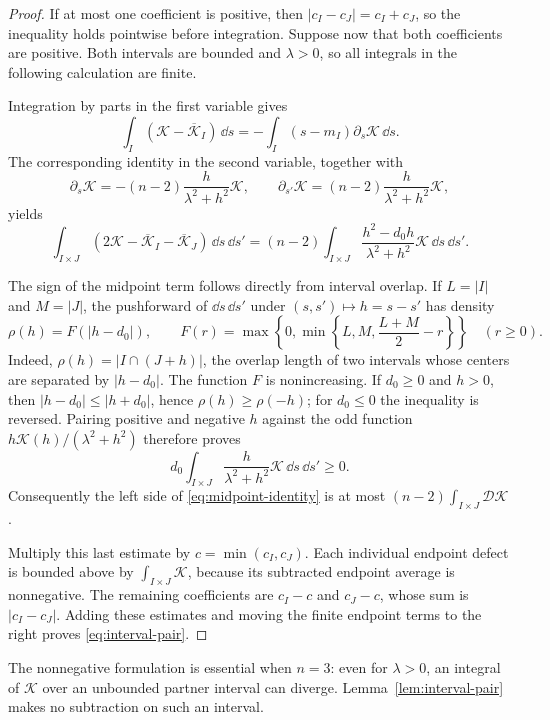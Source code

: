 \begin{proof}
If at most one coefficient is positive, then
$|c_I-c_J|=c_I+c_J$, so the inequality holds pointwise before integration.
Suppose now that both coefficients are positive.  Both intervals are
bounded and $\lambda>0$, so all integrals in the following calculation
are finite.

Integration by parts in the first variable gives
\[
 \int_I(\mathcal K-\overline{\mathcal K}_I)\,\dd s
 =-\int_I(s-m_I)\partial_s\mathcal K\,\dd s.
\]
The corresponding identity in the second variable, together with
\[
 \partial_s\mathcal K=-(n-2)\frac{h}{\lambda^2+h^2}\mathcal K,
 \qquad
 \partial_{s'}\mathcal K=(n-2)\frac{h}{\lambda^2+h^2}\mathcal K,
\]
yields
\begin{equation}\label{eq:midpoint-identity}
 \int_{I\times J}
  (2\mathcal K-\overline{\mathcal K}_I-\overline{\mathcal K}_J)
   \,\dd s\,\dd s'
 =(n-2)\int_{I\times J}
    \frac{h^2-d_0h}{\lambda^2+h^2}\mathcal K\,\dd s\,\dd s'.
\end{equation}

The sign of the midpoint term follows directly from interval overlap.
If $L=|I|$ and $M=|J|$, the pushforward of $\dd s\,\dd s'$ under
$(s,s')\mapsto h=s-s'$ has density
\[
 \rho(h)=F(|h-d_0|),\qquad
 F(r)=\max\left\{0,\min\left\{L,M,\frac{L+M}{2}-r\right\}\right\}
 \quad(r\ge0).
\]
Indeed, $\rho(h)=|I\cap(J+h)|$, the overlap length of two intervals
whose centers are separated by $|h-d_0|$.
The function $F$ is nonincreasing.  If $d_0\ge0$ and $h>0$, then
$|h-d_0|\le|h+d_0|$, hence $\rho(h)\ge\rho(-h)$; for $d_0\le0$
the inequality is reversed.  Pairing positive and negative $h$ against
the odd function
$h\mathcal K(h)/(\lambda^2+h^2)$ therefore proves
\[
 d_0\int_{I\times J}\frac{h}{\lambda^2+h^2}
                 \mathcal K\,\dd s\,\dd s'\ge0.
\]
Consequently the left side of \eqref{eq:midpoint-identity} is at most
$(n-2)\int_{I\times J}\mathcal D\mathcal K$.

Multiply this last estimate by $c=\min(c_I,c_J)$.  Each individual
endpoint defect is bounded above by $\int_{I\times J}\mathcal K$,
because its subtracted endpoint average is nonnegative.  The remaining
coefficients are $c_I-c$ and $c_J-c$, whose sum is $|c_I-c_J|$.
Adding these estimates and moving the finite endpoint terms to the
right proves \eqref{eq:interval-pair}.
\end{proof}

The nonnegative formulation is essential when $n=3$: even for
$\lambda>0$, an integral of $\mathcal K$ over an unbounded partner
interval can diverge.  Lemma~\ref{lem:interval-pair} makes no subtraction
on such an interval.
